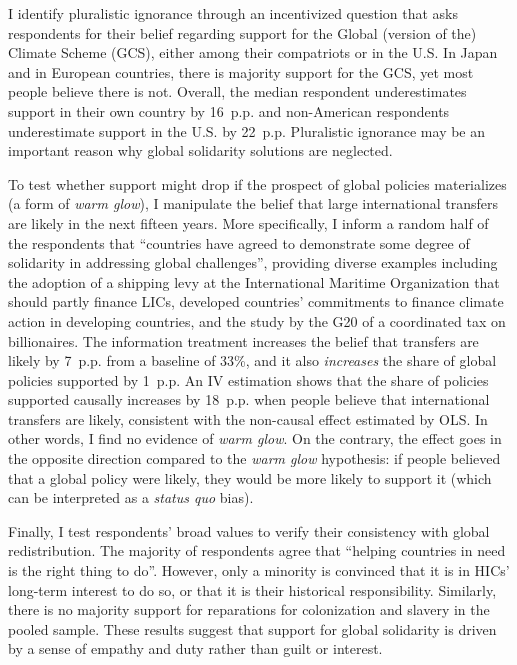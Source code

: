 \documentclass[12pt,english]{article}
\begin{document}
\begin{bibunit}
I identify pluralistic ignorance through an incentivized question that asks respondents for their belief regarding support for the Global (version of the) Climate Scheme (GCS), either among their compatriots or in the U.S. In Japan and in European countries, there is majority support for the GCS, yet most people believe there is not. Overall, the median respondent underestimates support in their own country by 16~p.p. and non-American respondents underestimate support in the U.S. by 22~p.p. Pluralistic ignorance may be an important reason why global solidarity solutions are neglected.

To test whether support might drop if the prospect of global policies materializes (a form of \textit{warm glow}), I manipulate the belief that large international transfers are likely in the next fifteen years. More specifically, I inform a random half of the respondents that ``countries have agreed to demonstrate some
degree of solidarity in addressing global challenges'', providing diverse examples including the %
adoption of a shipping levy at the International Maritime Organization that should partly finance LICs, developed countries' commitments to finance climate action in developing countries, and the study %
by the G20 of a coordinated %
tax on billionaires. The information treatment increases the belief that transfers are likely by 7~p.p. from a baseline of 33\%, and it %
also \textit{increases} the share of global policies supported by 1~p.p. %
An IV estimation shows that the share of policies supported causally increases by 18~p.p. when people believe that international transfers are likely, %
consistent with the non-causal effect estimated by OLS. 
In other words, I find no evidence of \textit{warm glow}. On the contrary, the effect goes in the opposite direction compared to the \textit{warm glow} hypothesis: if people believed that a global policy were likely, they would be more likely to support it (which can be interpreted as %
a \textit{status quo} bias). 

Finally, I test respondents' broad values to verify their consistency with global redistribution. The majority of respondents agree that ``helping countries in need is the right thing to do''. However, only a minority is convinced that it is in HICs' long-term interest to do so, or that it is their historical responsibility. Similarly, there is no majority support for reparations for colonization and slavery in the pooled sample. These results suggest that support for global solidarity is driven by a sense of empathy and duty rather than guilt or interest. 


\end{bibunit}
\end{document}

